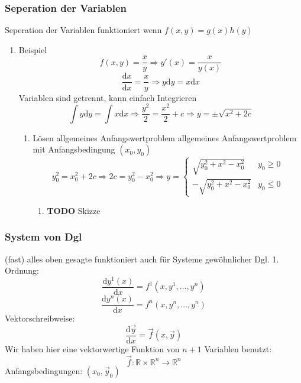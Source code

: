 \documentclass[11pt]{article}
\renewcommand{\d}{\mathrm{d}}
\newcommand{\f}[2]{\frac{#1}{#2}}
\renewcommand{\v}[1]{\vec{#1}}
\begin{document}
\subsubsection{Seperation der Variablen}
\label{sec-2-3-6}
Seperation der Variablen funktioniert wenn $f(x,y) = g(x)h(y)$
\begin{enumerate}
\item Beispiel
\label{sec-2-3-6-1}
\[f(x,y) = \f{x}{y} \Rightarrow y'(x) = \f{x}{y(x)}\]
\[\f{\d x}{\d x} = \f{x}{y} \Rightarrow y\d y = x\d x\]
Variablen sind getrennt, kann einfach Integrieren
\[\int y\d y = \int x\d x \Rightarrow \f{y^2}{2} = \f{x^2}{2} + c \Rightarrow y = \pm \sqrt{x^2 + 2c}\]
\begin{enumerate}
\item Lösen allgemeines Anfangswertproblem
\label{sec-2-3-6-1-1}
allgemeines Anfangswertproblem mit Anfangsbedingung $(x_0,y_0)$
\[y_0^2 = x_0^2 + 2c \Rightarrow 2c = y_0^2 - x_0^2 \Rightarrow y = \begin{cases} \sqrt{y_0^2 + x^2 - x_0^2} & y_0 \geq 0 \\ -\sqrt{y_0^2 + x^2 - x_0^2} & y_0 \leq 0 \end{cases}\]
\begin{enumerate}
\item {\bfseries\sffamily TODO} Skizze
\label{sec-2-3-6-1-1-1}
\end{enumerate}
\end{enumerate}
\end{enumerate}
\subsubsection{System von Dgl}
\label{sec-2-3-7}
(fast) alles oben gesagte funktioniert auch für Systeme gewöhnlicher Dgl. 1. Ordnung:
\[\f{\d y^1(x)}{\d x} = f^1(x,y^1,\ldots,y^n)\]
\[\f{\d y^n(x)}{\d x} = f^n(x,y^n,\ldots,y^n)\]
Vektorschreibweise:
\[\f{\d \v y}{\d x} = \v f(x,\v y)\]
Wir haben hier eine vektorwertige Funktion von $n+1$ Variablen benutzt:
\[\v f:\mathbb{R}\times\mathbb{R}^n\to \mathbb{R}^n\]
Anfangsbedingungen: $(x_0,\v{y}_0)$
\end{document}
